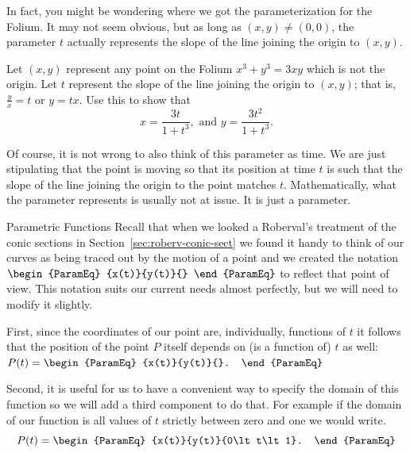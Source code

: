 In fact, you might be wondering where we got the parameterization for
the Folium.  It may not seem obvious, but as long as $(x,y)\neq(0,0)$, the
parameter $t$ actually represents the slope of the line joining the
origin to $(x,y)$.

\begin{embeddedproblem}
  Let $(x,y)$ represent any point on the Folium $x^3+y^3=3xy$ which is
  not the origin.  Let $t$ represent the slope of the line joining the
  origin to $(x,y)$; that is, $\frac{y}{x}=t$ or $y=tx$.  Use this to
  show that
  $$
  x=\frac{3t}{1+t^3},\text{ and } y=\frac{3t^2}{1+t^3}.
  $$
  \end{embeddedproblem}
  Of course, it is not wrong to also think of this parameter as time.
  We are just stipulating that the point is moving so that its
  position at time $t$ is such that the slope of the line joining the
  origin to the point matches $t$.  Mathematically, what the parameter
  represents is usually not at issue. It is just a parameter.


  \begin{mynotation}{Parametric Functions}
    Recall that when we looked a Roberval's treatment of the conic
    sections in Section~\ref{sec:roberv-conic-sect} we found it handy
    to think of our curves as being traced out by the motion of a
    point and we created the notation
    $
    \begin{ParamEq}
      {x(t)}{y(t)}{}
    \end{ParamEq}
    $ to reflect that point of view. This notation suits our current
    needs almost perfectly, but  we will need to  modify it slightly.

    First, since the coordinates of our point are, individually,
    functions of $t$ it follows that the position of the point $P$
    itself depends on (is a function of) $t$ as well: $P(t)= 
    \begin{ParamEq}
      {x(t)}{y(t)}{}.
    \end{ParamEq}
    $ 

    Second, it is useful for us to have a convenient way to specify
    the domain of this function so we will add a third component to do
    that. For example if the domain of our function is all
    values of $t$ strictly between zero and one we would write.
    $$
    P(t)=
    \begin{ParamEq}
      {x(t)}{y(t)}{0\lt t\lt1}.
    \end{ParamEq}
    $$
  \end{mynotation}

